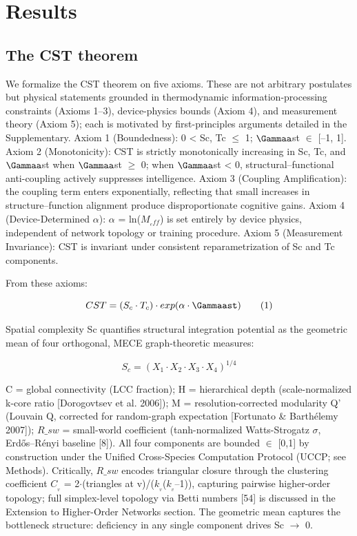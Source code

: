 \documentclass[a4paper,12pt]{article}
\begin{document}
\section{Results}


\subsection{The CST theorem}

We formalize the CST theorem on five axioms. These are not arbitrary postulates but physical statements grounded in thermodynamic information-processing constraints (Axioms 1--3), device-physics bounds (Axiom 4), and measurement theory (Axiom 5); each is motivated by first-principles arguments detailed in the Supplementary. Axiom 1 (Boundedness): 0 < Sc, Tc $\leq$ 1; $\Gammaa$st $\in$ [--1, 1]. Axiom 2 (Monotonicity): CST is strictly monotonically increasing in Sc, Tc, and $\Gammaa$st when $\Gammaa$st $\geq$ 0; when $\Gammaa$st < 0, structural--functional anti-coupling actively suppresses intelligence. Axiom 3 (Coupling Amplification): the coupling term enters exponentially, reflecting that small increases in structure--function alignment produce disproportionate cognitive gains. Axiom 4 (Device-Determined $\alpha$): $\alpha$ = ln($M_{_eff}$) is set entirely by device physics, independent of network topology or training procedure. Axiom 5 (Measurement Invariance): CST is invariant under consistent reparametrization of Sc and Tc components.


From these axioms:


\begin{equation}

CST = (S_c \cdot T_c) \cdot exp(\alpha \cdot \Gammaast) \tag{1}

\end{equation}


Spatial complexity Sc quantifies structural integration potential as the geometric mean of four orthogonal, MECE graph-theoretic measures:


\begin{equation}

S_c = (X_1 \cdot X_2 \cdot X_3 \cdot X_4)^{1/4} \tag{2}

\end{equation}


C = global connectivity (LCC fraction); H = hierarchical depth (scale-normalized k-core ratio [Dorogovtsev et al. 2006]); M = resolution-corrected modularity Q' (Louvain Q, corrected for random-graph expectation [Fortunato \& Barth\'{e}lemy 2007]); $R\_{sw}$ = small-world coefficient (tanh-normalized Watts-Strogatz $\sigma$, Erd\H{o}s--R\'{e}nyi baseline [8]). All four components are bounded $\in$ [0,1] by construction under the Unified Cross-Species Computation Protocol (UCCP; see Methods). Critically, $R\_{sw}$ encodes triangular closure through the clustering coefficient $C_{_v}$ = 2$\cdot$(triangles at v)/($k_{_v}$($k_{_v}$--1)), capturing pairwise higher-order topology; full simplex-level topology via Betti numbers [54] is discussed in the Extension to Higher-Order Networks section. The geometric mean captures the bottleneck structure: deficiency in any single component drives Sc $\rightarrow$ 0.
\end{document}
